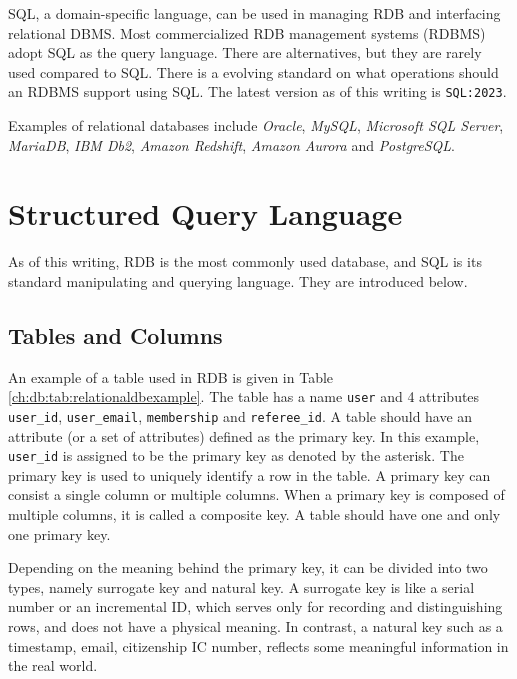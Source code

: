 SQL, a domain-specific language, can be used in managing RDB and interfacing relational DBMS.  Most commercialized RDB management systems (RDBMS) adopt SQL as the query language. There are alternatives, but they are rarely used compared to SQL. There is a evolving standard on what operations should an RDBMS support using SQL. The latest version as of this writing is \verb|SQL:2023|.

Examples of relational databases include \textit{Oracle}, \textit{MySQL}, \textit{Microsoft SQL Server}, \textit{MariaDB}, \textit{IBM Db2}, \textit{Amazon Redshift}, \textit{Amazon Aurora} and \textit{PostgreSQL}.

\section{Structured Query Language}

As of this writing, RDB is the most commonly used database, and SQL is its standard manipulating and querying language. They are introduced below.

\subsection{Tables and Columns} \label{ch:db:subsec:tables}

An example of a table used in RDB is given in Table \ref{ch:db:tab:relationaldbexample}. The table has a name \verb|user| and 4 attributes \verb|user_id|, \verb|user_email|, \verb|membership| and \verb|referee_id|. A table should have an attribute (or a set of attributes) defined as the primary key. In this example, \verb|user_id| is assigned to be the primary key as denoted by the asterisk. The primary key is used to uniquely identify a row in the table. A primary key can consist a single column or multiple columns. When a primary key is composed of multiple columns, it is called a composite key. A table should have one and only one primary key.

Depending on the meaning behind the primary key, it can be divided into two types, namely surrogate key and natural key. A surrogate key is like a serial number or an incremental ID, which serves only for recording and distinguishing rows, and does not have a physical meaning. In contrast, a natural key such as a timestamp, email, citizenship IC number, reflects some meaningful information in the real world.


